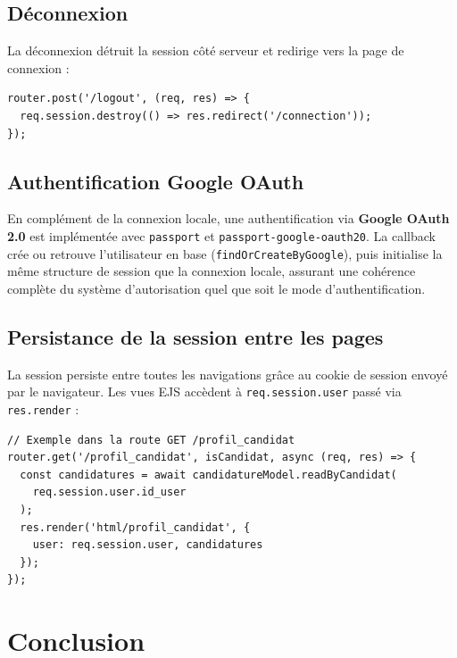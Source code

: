 \documentclass[12pt,a4paper]{article}
\begin{document}
\subsection{Déconnexion}

La déconnexion détruit la session côté serveur et redirige vers la page de connexion :

\begin{lstlisting}
router.post('/logout', (req, res) => {
  req.session.destroy(() => res.redirect('/connection'));
});
\end{lstlisting}

\subsection{Authentification Google OAuth}

En complément de la connexion locale, une authentification via \textbf{Google OAuth 2.0} est implémentée avec \texttt{passport} et \texttt{passport-google-oauth20}. La callback crée ou retrouve l'utilisateur en base (\texttt{findOrCreateByGoogle}), puis initialise la même structure de session que la connexion locale, assurant une cohérence complète du système d'autorisation quel que soit le mode d'authentification.

\subsection{Persistance de la session entre les pages}

La session persiste entre toutes les navigations grâce au cookie de session envoyé par le navigateur. Les vues EJS accèdent à \texttt{req.session.user} passé via \texttt{res.render} :

\begin{lstlisting}
// Exemple dans la route GET /profil_candidat
router.get('/profil_candidat', isCandidat, async (req, res) => {
  const candidatures = await candidatureModel.readByCandidat(
    req.session.user.id_user
  );
  res.render('html/profil_candidat', {
    user: req.session.user, candidatures
  });
});
\end{lstlisting}

\section{Conclusion}
\end{document}
